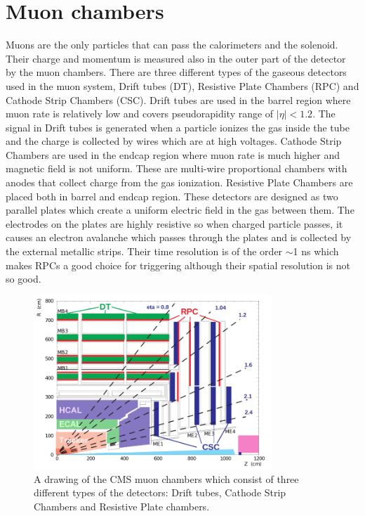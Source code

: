 
\section{Muon chambers}

Muons are the only particles that can pass the calorimeters and the solenoid. Their charge and momentum is measured also in the outer part of the detector by the muon chambers. There are three different types of the gaseous detectors used in the muon system, Drift tubes (DT), Resistive Plate Chambers (RPC) and Cathode Strip Chambers (CSC). Drift tubes are used in the barrel region where muon rate is relatively low and covers pseudorapidity range of $|\eta|<1.2$. The signal in Drift tubes is generated when a particle ionizes the gas inside the tube and the charge is collected by wires which are at high voltages. Cathode Strip Chambers are used in the endcap region where muon rate is much higher and magnetic field is not uniform. These are multi-wire proportional chambers with anodes that collect charge from the gas ionization. Resistive Plate Chambers are placed both in barrel and endcap region. These detectors are designed as two parallel plates which create a uniform electric field in the gas between them. The electrodes on the plates are highly resistive so  when charged particle passes, it causes an electron avalanche which passes through the plates and is collected by the external metallic strips. Their time resolution is of the order $\sim$1 ns which makes RPCs a good choice for triggering although their spatial resolution is not so good.
\begin{figure}[htbp]
	\centering
		\includegraphics[width=0.8\textwidth]{Figures/Muon_chambres.png}
	\caption[CMS Muon Chambers]{A drawing of the CMS muon chambers which consist of three different types of the detectors: Drift tubes, Cathode Strip Chambers and Resistive Plate chambers. \cite{Chatrchyan:2008aa}}
	\label{fig:Mu}
\end{figure} 
